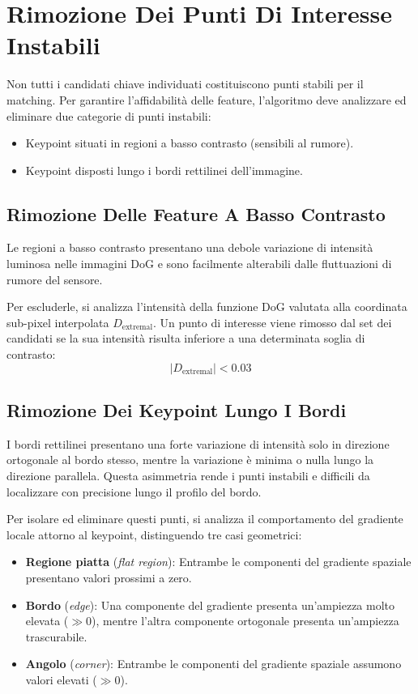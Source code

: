 ﻿\documentclass[11pt, a4paper]{article}
\begin{document}
\newpage

\section{Rimozione Dei Punti Di Interesse Instabili}

Non tutti i candidati chiave individuati costituiscono punti stabili per il matching. Per garantire l'affidabilità delle feature, l'algoritmo deve analizzare ed eliminare due categorie di punti instabili:
\begin{itemize}
    \item Keypoint situati in regioni a basso contrasto (sensibili al rumore).
    \item Keypoint disposti lungo i bordi rettilinei dell'immagine.
\end{itemize}

\subsection{Rimozione Delle Feature A Basso Contrasto}

Le regioni a basso contrasto presentano una debole variazione di intensità luminosa nelle immagini DoG e sono facilmente alterabili dalle fluttuazioni di rumore del sensore.

Per escluderle, si analizza l'intensità della funzione DoG valutata alla coordinata sub-pixel interpolata $D_{\text{extremal}}$. Un punto di interesse viene rimosso dal set dei candidati se la sua intensità risulta inferiore a una determinata soglia di contrasto:
\[ \boxed{|D_{\text{extremal}}| < 0.03} \]


\subsection{Rimozione Dei Keypoint Lungo I Bordi}

I bordi rettilinei presentano una forte variazione di intensità solo in direzione ortogonale al bordo stesso, mentre la variazione è minima o nulla lungo la direzione parallela. Questa asimmetria rende i punti instabili e difficili da localizzare con precisione lungo il profilo del bordo.

Per isolare ed eliminare questi punti, si analizza il comportamento del gradiente locale attorno al keypoint, distinguendo tre casi geometrici:
\begin{itemize}
    \item \textbf{Regione piatta} (\emph{flat region}): Entrambe le componenti del gradiente spaziale presentano valori prossimi a zero.
    \item \textbf{Bordo} (\emph{edge}): Una componente del gradiente presenta un'ampiezza molto elevata ($\gg 0$), mentre l'altra componente ortogonale presenta un'ampiezza trascurabile.
    \item \textbf{Angolo} (\emph{corner}): Entrambe le componenti del gradiente spaziale assumono valori elevati ($\gg 0$).
\end{itemize}
\end{document}
